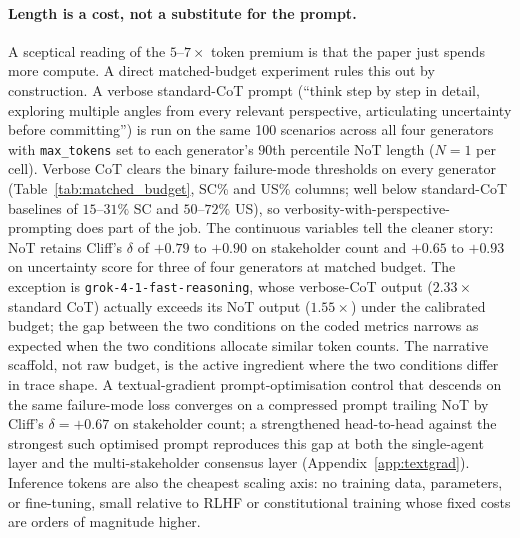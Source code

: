 \documentclass[11pt]{article}
\begin{document}
\paragraph{Length is a cost, not a substitute for the prompt.} A
sceptical reading of the $5$--$7\times$ token premium is that the
paper just spends more compute. A direct matched-budget experiment
rules this out by construction. A verbose standard-CoT prompt
(``think step by step in detail, exploring multiple angles from every
relevant perspective, articulating uncertainty before committing'') is
run on the same 100 scenarios across all four generators with
\texttt{max\_tokens} set to each generator's $90$th percentile NoT
length ($N{=}1$ per cell). Verbose CoT clears the binary failure-mode
thresholds on every generator (Table~\ref{tab:matched_budget}, SC\%
and US\% columns; well below standard-CoT baselines of $15$--$31\%$
SC and $50$--$72\%$ US), so verbosity-with-perspective-prompting does
part of the job. The continuous variables tell the cleaner story:
NoT retains Cliff's $\delta$ of $+0.79$ to $+0.90$ on stakeholder
count and $+0.65$ to $+0.93$ on uncertainty score for three of four
generators at matched budget. The exception is
\texttt{grok-4-1-fast-reasoning}, whose verbose-CoT output
($2.33\times$ standard CoT) actually exceeds its NoT output
($1.55\times$) under the calibrated budget; the gap between the two
conditions on the coded metrics narrows as expected when the two
conditions allocate similar token counts. The narrative scaffold,
not raw budget, is the active ingredient where the two conditions
differ in trace shape. A textual-gradient prompt-optimisation
control \cite{yuksekgonul2024textgrad} that descends on the same
failure-mode loss converges on a compressed prompt trailing NoT
by Cliff's $\delta = +0.67$ on stakeholder count; a strengthened
head-to-head against the strongest such optimised prompt
reproduces this gap at both the single-agent layer and the
multi-stakeholder consensus layer (Appendix~\ref{app:textgrad}).
Inference tokens are also the cheapest scaling axis: no training
data, parameters, or fine-tuning, small relative to RLHF or
constitutional training whose fixed costs are orders of magnitude
higher.
\end{document}
